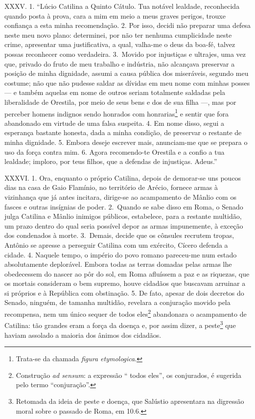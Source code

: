 XXXV. 1. “Lúcio Catilina a Quinto Cátulo. Tua notável lealdade, reconhecida
quando posta à prova, cara a mim em meio a meus graves perigos, trouxe
confiança a esta minha recomendação. 2. Por isso, decidi não preparar uma defesa
neste meu novo plano: determinei, por não ter nenhuma cumplicidade neste crime,
apresentar uma justificativa, a qual, valha-me o deus da boa-fé, talvez possas
reconhecer como verdadeira. 3.~Movido por injustiças e ultrajes, uma vez que,
privado do fruto de meu trabalho e indústria, não alcançava preservar a posição
de minha dignidade, assumi a causa pública dos miseráveis, segundo meu costume;
não que não pudesse saldar as dívidas em meu nome com minhas posses --- e
também aquelas em nome de outros seriam totalmente saldadas pela liberalidade
de Orestila, por meio de seus bens e dos de sua filha ---, mas por perceber
homens indignos sendo honrados com honrarias\footnote{Trata-se da chamada
\emph{figura etymologica}.} e sentir que fora abandonado em virtude de uma
falsa suspeita. 4. Em nome disso, segui a esperança bastante honesta, dada a
minha condição, de preservar o restante de minha dignidade. 5. Embora deseje
escrever mais, anunciam-me que se prepara o uso da força contra mim. 6. Agora
recomendo-te Orestila e a confio a tua lealdade; imploro, por teus filhos, que
a defendas de injustiças. Adeus.”

XXXVI. 1. Ora, enquanto o próprio Catilina, depois de demorar-se uns poucos
dias na casa de Gaio Flamínio, no território de Arécio, fornece armas à vizinhança
que já antes incitara, dirige-se ao acampamento de Mânlio com os fasces e
outras insígnias de poder. 2.~Quando se sabe disso em Roma, o Senado julga
Catilina e Mânlio inimigos públicos, estabelece, para a restante multidão, um
prazo dentro do qual seria possível depor as armas impunemente, à exceção dos
condenados à morte. 3.~Demais, decide que os cônsules recrutem tropas, Antônio
se apresse a perseguir Catilina com um exército, Cícero defenda a cidade. 4.
Naquele tempo, o império do povo romano pareceu-me num estado absolutamente
deplorável. Embora todas as terras domadas pelas armas lhe obedecessem do
nascer ao pôr do sol, em Roma afluíssem a paz e as riquezas, que os mortais
consideram o bem supremo, houve cidadãos que buscavam arruinar a si próprios e
à República com obstinação. 5. De fato, apesar de dois decretos do Senado,
ninguém, de tamanha multidão, revelara a conjuração movido pela recompensa,
nem um único sequer de todos eles\footnote{Construção \emph{ad sensum}: a
expressão `` todos eles'', os conjurados, é sugerida pelo termo
``conjuração''.} abandonara o acampamento de Catilina: tão  grandes eram a
força da doença e, por assim dizer, a peste\footnote{Retomada da ideia de peste
e doença, que Salústio apresentara na digressão moral sobre o passado de Roma, em 10.6.} que haviam assolado a maioria dos ânimos dos cidadãos.

